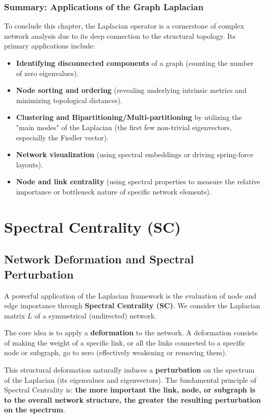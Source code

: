 \subsubsection{Summary: Applications of the Graph Laplacian}
To conclude this chapter, the Laplacian operator is a cornerstone of complex network analysis due to its deep connection to the structural topology. Its primary applications include:
\begin{itemize}
    \item \textbf{Identifying disconnected components} of a graph (counting the number of zero eigenvalues).
    \item \textbf{Node sorting and ordering} (revealing underlying intrinsic metrics and minimizing topological distances).
    \item \textbf{Clustering and Bipartitioning/Multi-partitioning} by utilizing the "main modes" of the Laplacian (the first few non-trivial eigenvectors, especially the Fiedler vector).
    \item \textbf{Network visualization} (using spectral embeddings or driving spring-force layouts).
    \item \textbf{Node and link centrality} (using spectral properties to measure the relative importance or bottleneck nature of specific network elements).
\end{itemize}

\section{Spectral Centrality (SC)}

\subsection{Network Deformation and Spectral Perturbation}
A powerful application of the Laplacian framework is the evaluation of node and edge importance through \textbf{Spectral Centrality (SC)}. We consider the Laplacian matrix \( L \) of a symmetrical (undirected) network.

The core idea is to apply a \textbf{deformation} to the network. A deformation consists of making the weight of a specific link, or all the links connected to a specific node or subgraph, go to zero (effectively weakening or removing them).

This structural deformation naturally induces a \textbf{perturbation} on the spectrum of the Laplacian (its eigenvalues and eigenvectors). The fundamental principle of Spectral Centrality is: \textbf{the more important the link, node, or subgraph is to the overall network structure, the greater the resulting perturbation on the spectrum}.


